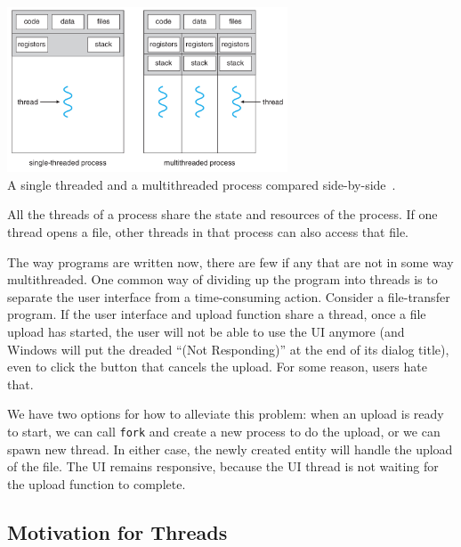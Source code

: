 \begin{center}
	\includegraphics[width=0.625\textwidth]{images/mthread2.png}\\
	A single threaded and a multithreaded process compared side-by-side~\cite{osc}.
\end{center}

All the threads of a process share the state and resources of the process. If one thread opens a file, other threads in that process can also access that file.

The way programs are written now, there are few if any that are not in some way multithreaded. One common way of dividing up the program into threads is to separate the user interface from a time-consuming action. Consider a file-transfer program. If the user interface and upload function share a thread, once a file upload has started, the user will not be able to use the UI anymore (and Windows will put the dreaded ``(Not Responding)'' at the end of its dialog title), even to click the button that cancels the upload. For some reason, users hate that.

We have two options for how to alleviate this problem: when an upload is ready to start, we can call \texttt{fork} and create a new process to do the upload, or we can spawn  new thread. In either case, the newly created entity will handle the upload of the file. The UI remains responsive, because the UI thread is not waiting for the upload function to complete.

\subsection*{Motivation for Threads}

